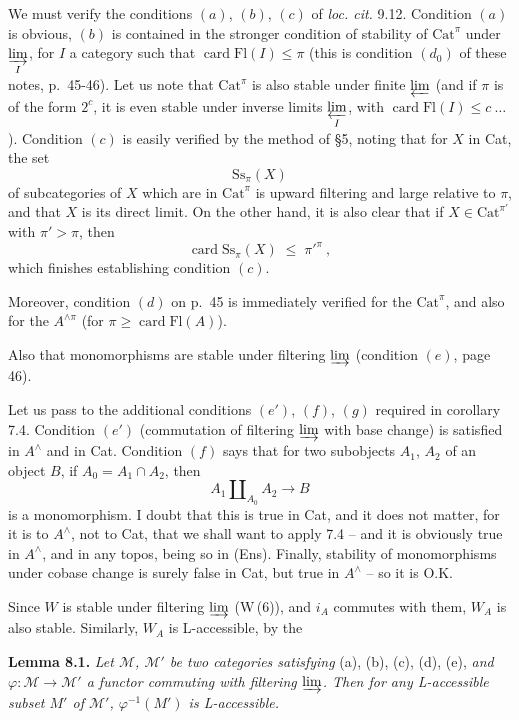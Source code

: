\documentclass[11pt]{article}
\newcommand{\msp}[1]{\marginpar{\footnotesize [#1]}}
\newcommand{\Fl}{\mathrm{Fl}}
\newcommand{\Cat}{\mathrm{Cat}}
\newcommand{\chap}{^{\wedge}}
\begin{document}
We must verify the conditions $(a)$, $(b)$, $(c)$ of \textit{loc. cit.} 9.12. Condition $(a)$ is obvious, $(b)$ is contained in the stronger condition of stability of $\Cat^{\pi}$ under $\varinjlim\limits_{I}$, for $I$ a category such that $\operatorname{card}\Fl(I)\leq\pi$ (this is condition $(d_0)$ of these notes, p.~45-46). Let us note that $\Cat^{\pi}$ is also stable under finite $\varprojlim$ (and if $\pi$ is of the form $2^c$, it is even stable under inverse limits $\varprojlim\limits_{I}$, with $\operatorname{card}\Fl(I)\leq c\ \ldots$). Condition $(c)$ is easily verified by the method of §5, noting that for $X$ in Cat, the set
\[
\mathrm{Ss}_{\pi}(X)
\]
of subcategories of $X$ which are in $\Cat^{\pi}$ is upward filtering and large relative to $\pi$, and that $X$ is its direct limit. On the other hand, it is also clear that if $X\in\Cat^{\pi'}$ with $\pi'>\pi$, then
\[
\operatorname{card}\mathrm{Ss}_{\pi}(X) \;\leq\; \pi'^{\pi}\ ,
\]
which finishes establishing condition $(c)$.

Moreover, condition $(d)$ on p.~45 is immediately verified for the $\Cat^{\pi}$, and also for the $A^{\wedge\pi}$ (for $\pi\geq\operatorname{card}\Fl(A)$).

Also that monomorphisms are stable under filtering $\varinjlim$ (condition $(e)$, page 46).

\msp{page 102}
Let us pass to the additional conditions $(e')$, $(f)$, $(g)$ required in corollary 7.4. Condition $(e')$ (commutation of filtering $\varinjlim$ with base change) is satisfied in $A\chap$ and in Cat. Condition $(f)$ says that for two subobjects $A_1$, $A_2$ of an object $B$, if $A_0=A_1\cap A_2$, then
\[
A_1\amalg_{A_0}A_2 \longrightarrow B
\]
is a monomorphism. I doubt that this is true in Cat, and it does not matter, for it is to $A\chap$, not to Cat, that we shall want to apply 7.4 -- and it is obviously true in $A\chap$, and in any topos, being so in (Ens). Finally, stability of monomorphisms under cobase change is surely false in Cat, but true in $A\chap$ -- so it is O.K.

Since $W$ is stable under filtering $\varinjlim$ (W\,(6)), and $i_A$ commutes with them, $W_A$ is also stable. Similarly, $W_A$ is L-accessible, by the

\textbf{Lemma 8.1.} \textit{Let $\mathcal{M}$, $\mathcal{M}'$ be two categories satisfying} (a), (b), (c), (d), (e), \textit{and $\varphi:\mathcal{M}\longrightarrow\mathcal{M}'$ a functor commuting with filtering $\varinjlim$. Then for any L-accessible subset $M'$ of $\mathcal{M}'$, $\varphi^{-1}(M')$ is L-accessible.}
\end{document}
